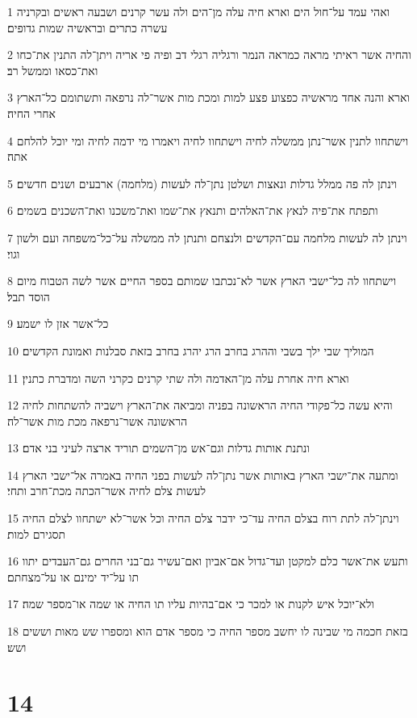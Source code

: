\par 1 ואהי עמד על־חול הים וארא חיה עלה מן־הים ולה עשר קרנים ושבעה ראשים ובקרניה עשרה כתרים ובראשיה שמות גדופים׃
\par 2 והחיה אשר ראיתי מראה כמראה הנמר ורגליה רגלי דב ופיה פי אריה ויתן־לה התנין את־כחו ואת־כסאו וממשל רב׃
\par 3 וארא והנה אחד מראשיה כפצוע פצע למות ומכת מות אשר־לה נרפאה ותשתומם כל־הארץ אחרי החיה׃
\par 4 וישתחוו לתנין אשר־נתן ממשלה לחיה וישתחוו לחיה ויאמרו מי ידמה לחיה ומי יוכל להלחם אתה׃
\par 5 וינתן לה פה ממלל גדלות ונאצות ושלטן נתן־לה לעשות (מלחמה) ארבעים ושנים חדשים׃
\par 6 ותפתח את־פיה לנאץ את־האלהים ותנאץ את־שמו ואת־משכנו ואת־השכנים בשמים׃
\par 7 וינתן לה לעשות מלחמה עם־הקדשים ולנצחם ותנתן לה ממשלה על־כל־משפחה ועם ולשון וגוי׃
\par 8 וישתחוו לה כל־ישבי הארץ אשר לא־נכתבו שמותם בספר החיים אשר לשה הטבוח מיום הוסד תבל׃
\par 9 כל־אשר אזן לו ישמע׃
\par 10 המוליך שבי ילך בשבי וההרג בחרב הרג יהרג בחרב בזאת סבלנות ואמונת הקדשים׃
\par 11 וארא חיה אחרת עלה מן־האדמה ולה שתי קרנים כקרני השה ומדברת כתנין׃
\par 12 והיא עשה כל־פקודי החיה הראשונה בפניה ומביאה את־הארץ וישביה להשתחות לחיה הראשונה אשר־נרפאה מכת מות אשר־לה׃
\par 13 ונתנת אותות גדלות וגם־אש מן־השמים תוריד ארצה לעיני בני אדם׃
\par 14 ומתעה את־ישבי הארץ באותות אשר נתן־לה לעשות בפני החיה באמרה אל־ישבי הארץ לעשות צלם לחיה אשר־הכתה מכת־חרב ותחי׃
\par 15 וינתן־לה לתת רוח בצלם החיה עד־כי ידבר צלם החיה וכל אשר־לא ישתחוו לצלם החיה תסגירם למות׃
\par 16 ותעש את־אשר כלם למקטן ועד־גדול אם־אביון ואם־עשיר גם־בני החרים גם־העבדים יתוו תו על־יד ימינם או על־מצחתם׃
\par 17 ולא־יוכל איש לקנות או למכר כי אם־בהיות עליו תו החיה או שמה או־מספר שמה׃
\par 18 בזאת חכמה מי שבינה לו יחשב מספר החיה כי מספר אדם הוא ומספרו שש מאות וששים ושש׃

\chapter{14}

